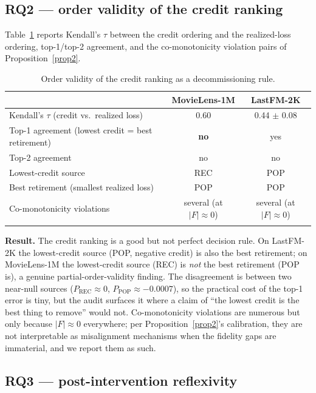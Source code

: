 \documentclass[pdflatex,sn-mathphys-num]{sn-jnl}
\theoremstyle{thmstyleone}%
\theoremstyle{thmstyletwo}%
\theoremstyle{thmstylethree}%
\newcommand{\pred}{P}
\begin{document}
\subsection{RQ2 --- order validity of the credit ranking}\label{subsec4_4}

Table~\ref{tab5} reports Kendall's $\tau$ between the credit ordering and the realized-loss ordering, top-1/top-2 agreement, and the co-monotonicity violation pairs of Proposition~\ref{prop2}.

\begin{table}[h]
\caption{Order validity of the credit ranking as a decommissioning rule.}
\label{tab5}
\begin{tabular*}{\textwidth}{@{\extracolsep\fill}lcc}
\toprule
 & MovieLens-1M & LastFM-2K \\
\midrule
Kendall's $\tau$ (credit vs.\ realized loss) & 0.60 & 0.44 $\pm$ 0.08 \\
Top-1 agreement (lowest credit = best retirement) & \textbf{no} & yes \\
Top-2 agreement & no & no \\
Lowest-credit source & REC & POP \\
Best retirement (smallest realized loss) & POP & POP \\
Co-monotonicity violations & several (at $|F|\approx0$) & several (at $|F|\approx0$) \\
\botrule
\end{tabular*}
\end{table}

\textbf{Result.} The credit ranking is a good but not perfect decision rule. On LastFM-2K the lowest-credit source (POP, negative credit) is also the best retirement; on MovieLens-1M the lowest-credit source (REC) is \emph{not} the best retirement (POP is), a genuine partial-order-validity finding. The disagreement is between two near-null sources ($\pred_{\mathrm{REC}}\approx 0$, $\pred_{\mathrm{POP}}\approx -0.0007$), so the practical cost of the top-1 error is tiny, but the audit surfaces it where a claim of ``the lowest credit is the best thing to remove'' would not. Co-monotonicity violations are numerous but only because $|F|\approx 0$ everywhere; per Proposition~\ref{prop2}'s calibration, they are not interpretable as misalignment mechanisms when the fidelity gaps are immaterial, and we report them as such.

\subsection{RQ3 --- post-intervention reflexivity}\label{subsec4_5}
\end{document}
